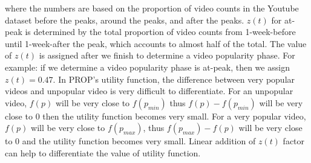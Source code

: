 \documentclass[10pt,final,journal,a4paper]{IEEEtran}
\begin{document}
where the numbers are based on the proportion of video counts in the Youtube dataset before the peaks, around the peaks, and after the peaks. 
$z(t)$ for at-peak is determined by the total proportion of video counts from 1-week-before until 1-week-after the peak, which accounts to almost half of the total.
The value of $z(t)$ is assigned after we finish to determine a video popularity phase.  
For example: if we determine a video popularity phase is at-peak, then we assign $z(t)=0.47$.
In PROP's utility function, the difference between very popular videos and unpopular video is very difficult to differentiate. 
For an unpopular video, $f(p)$ will be very close to $f(p_{min})$ thus $f(p) - f(p_{min})$ will be very close to $0$ then the utility function becomes very small.
For a very popular video, $f(p)$ will be very close to $f(p_{max})$, thus $f(p_{max}) - f(p)$ will be very close to $0$ and the  utility function becomes very small.  
Linear addition of $z(t)$ factor can help to differentiate the value of utility function.
\end{document}
